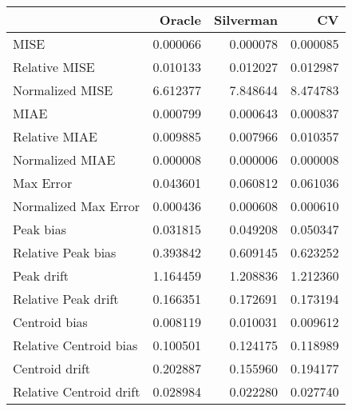 \begin{tabular}{lrrr}
  \hline
 & Oracle & Silverman & CV \\ 
  \hline
MISE & 0.000066 & 0.000078 & 0.000085 \\ 
  Relative MISE & 0.010133 & 0.012027 & 0.012987 \\ 
  Normalized MISE & 6.612377 & 7.848644 & 8.474783 \\ 
  MIAE & 0.000799 & 0.000643 & 0.000837 \\ 
  Relative MIAE & 0.009885 & 0.007966 & 0.010357 \\ 
  Normalized MIAE & 0.000008 & 0.000006 & 0.000008 \\ 
  Max Error & 0.043601 & 0.060812 & 0.061036 \\ 
  Normalized Max Error & 0.000436 & 0.000608 & 0.000610 \\ 
  Peak bias & 0.031815 & 0.049208 & 0.050347 \\ 
  Relative Peak bias & 0.393842 & 0.609145 & 0.623252 \\ 
  Peak drift & 1.164459 & 1.208836 & 1.212360 \\ 
  Relative Peak drift & 0.166351 & 0.172691 & 0.173194 \\ 
  Centroid bias & 0.008119 & 0.010031 & 0.009612 \\ 
  Relative Centroid bias & 0.100501 & 0.124175 & 0.118989 \\ 
  Centroid drift & 0.202887 & 0.155960 & 0.194177 \\ 
  Relative Centroid drift & 0.028984 & 0.022280 & 0.027740 \\ 
   \hline
\end{tabular}
